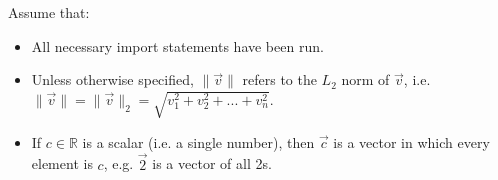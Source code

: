\documentclass[twoside,12pt]{article}
\begin{document}
\vspace{0.1in}

\noindent Assume that:
\begin{itemize}
    \item All necessary import statements have been run.
    \item Unless otherwise specified, $\lVert \vec v \rVert$ refers to the $L_2$ norm of $\vec v$, i.e. $\lVert \vec v \rVert = \lVert \vec v \rVert_2 = \sqrt{v_1^2 + v_2^2 + ... + v_n^2}$.
    \item If $c \in \mathbb{R}$ is a scalar (i.e. a single number), then $\vec c$ is a vector in which every element is $c$, e.g. $\vec 2$ is a vector of all 2s.
\end{itemize}











\end{document}
